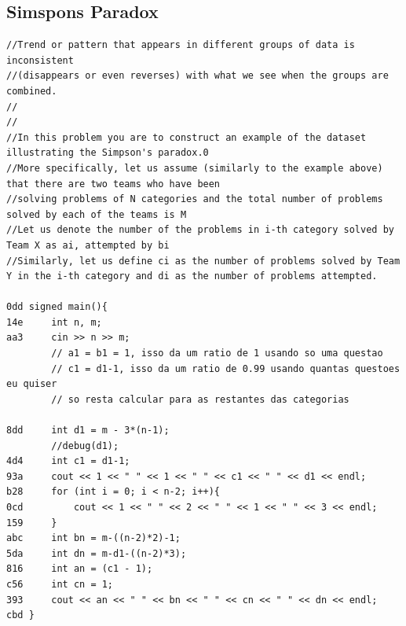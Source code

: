 \documentclass[11pt, a4paper, twoside]{article}
\begin{document}
\subsection{Simspons Paradox}
\begin{lstlisting}
//Trend or pattern that appears in different groups of data is inconsistent 
//(disappears or even reverses) with what we see when the groups are combined.
//
//
//In this problem you are to construct an example of the dataset illustrating the Simpson's paradox.0
//More specifically, let us assume (similarly to the example above) that there are two teams who have been 
//solving problems of N categories and the total number of problems solved by each of the teams is M
//Let us denote the number of the problems in i-th category solved by Team X as ai, attempted by bi
//Similarly, let us define ci as the number of problems solved by Team Y in the i-th category and di as the number of problems attempted.

0dd signed main(){
14e     int n, m;
aa3     cin >> n >> m; 
        // a1 = b1 = 1, isso da um ratio de 1 usando so uma questao
        // c1 = d1-1, isso da um ratio de 0.99 usando quantas questoes eu quiser
        // so resta calcular para as restantes das categorias
        
8dd     int d1 = m - 3*(n-1);
        //debug(d1);
4d4     int c1 = d1-1;
93a     cout << 1 << " " << 1 << " " << c1 << " " << d1 << endl;
b28     for (int i = 0; i < n-2; i++){
0cd         cout << 1 << " " << 2 << " " << 1 << " " << 3 << endl;
159     }
abc     int bn = m-((n-2)*2)-1;
5da     int dn = m-d1-((n-2)*3);
816     int an = (c1 - 1);
c56     int cn = 1;
393     cout << an << " " << bn << " " << cn << " " << dn << endl;
cbd }
\end{lstlisting}
\end{document}
